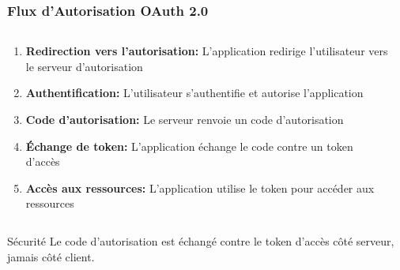 \documentclass[aspectratio=169]{beamer}
\begin{document}
\begin{frame}
    \frametitle{Flux d'Autorisation OAuth 2.0}
    \begin{columns}
        \begin{column}{0.6\textwidth}
            \begin{enumerate}
                \item \textcolor{primaryblue}{\textbf{Redirection vers l'autorisation:}} L'application redirige l'utilisateur vers le serveur d'autorisation
                \item \textcolor{accentgreen}{\textbf{Authentification:}} L'utilisateur s'authentifie et autorise l'application
                \item \textcolor{warningorange}{\textbf{Code d'autorisation:}} Le serveur renvoie un code d'autorisation
                \item \textcolor{errorred}{\textbf{Échange de token:}} L'application échange le code contre un token d'accès
                \item \textcolor{primaryblue}{\textbf{Accès aux ressources:}} L'application utilise le token pour accéder aux ressources
            \end{enumerate}
        \end{column}
        \begin{column}{0.4\textwidth}
            \begin{center}
            \end{center}
        \end{column}
    \end{columns}
    
    \vspace{0.5cm}
    \begin{alertblock}{Sécurité}
        Le code d'autorisation est échangé contre le token d'accès côté serveur, jamais côté client.
    \end{alertblock}
\end{frame}
\end{document}
